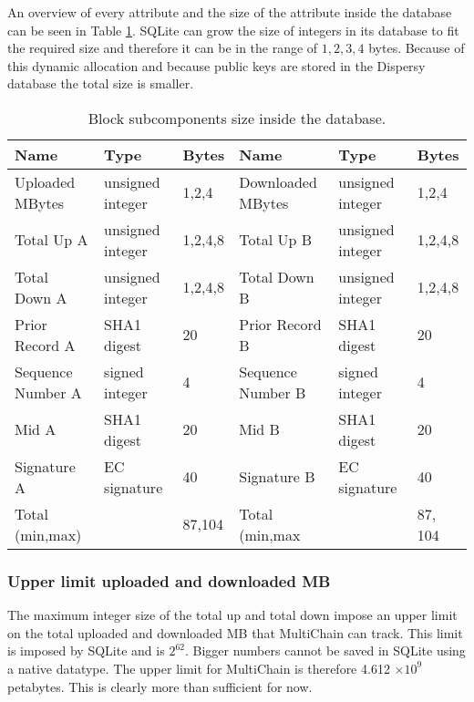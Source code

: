 An overview of every attribute and the size of the attribute inside the database can be seen in Table \ref{table:block_size_persistence}.
SQLite can grow the size of integers in its database to fit the required size
and therefore it can be in the range of $1,2,3,4$ bytes.
Because of this dynamic allocation and because public keys are stored in the Dispersy database
the total size is smaller.

\begin{table}[]
\begin{adjustwidth}{-.5in}{-.5in}
\begin{center}
\begin{tabular}{lll||lll}
Name              & Type             & Bytes                  & Name              & Type             & Bytes    \\ \hline
Uploaded MBytes   & unsigned integer & 1,2,4                  & Downloaded MBytes & unsigned integer & 1,2,4    \\
Total Up A        & unsigned integer & 1,2,4,8                & Total Up B        & unsigned integer & 1,2,4,8  \\
Total Down A      & unsigned integer & 1,2,4,8                & Total Down B      & unsigned integer & 1,2,4,8  \\
Prior Record A    & SHA1 digest      & 20                     & Prior Record B    & SHA1 digest      & 20       \\
Sequence Number A & signed integer   & 4                      & Sequence Number B & signed integer   & 4        \\
Mid A             & SHA1 digest      & 20                     & Mid B             & SHA1 digest      & 20       \\
Signature A       & EC signature     & 40                     & Signature B       & EC signature     & 40       \\ \hline
Total (min,max)   &                  & 87,104                 & Total (min,max    &                  & 87, 104
\end{tabular}
\caption{Block subcomponents size inside the database.}
\label{table:block_size_persistence}
\end{center}
\end{adjustwidth}
\end{table}

\subsubsection{Upper limit uploaded and downloaded MB}
The maximum integer size of the total up and total down impose an upper limit
on the total uploaded and downloaded MB that MultiChain can track.
This limit is imposed by SQLite and is $2^{62}$.
Bigger numbers cannot be saved in SQLite using a native datatype.
The upper limit for MultiChain is therefore 4.612 \ensuremath{\times 10^{9}} petabytes.
This is clearly more than sufficient for now.